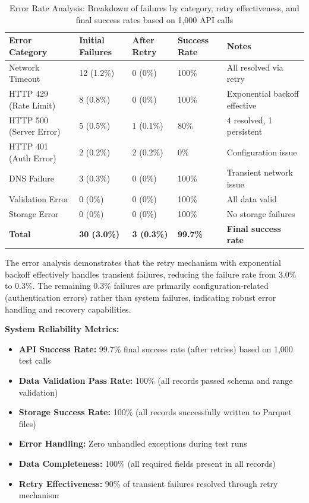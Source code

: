 \documentclass[12pt,a4paper]{article}
\begin{document}
\begin{table}[H]
\centering
\begin{tabular}{|l|l|l|l|l|}
\hline
\textbf{Error Category} & \textbf{Initial Failures} & \textbf{After Retry} & \textbf{Success Rate} & \textbf{Notes} \\
\hline
Network Timeout & 12 (1.2\%) & 0 (0\%) & 100\% & All resolved via retry \\
HTTP 429 (Rate Limit) & 8 (0.8\%) & 0 (0\%) & 100\% & Exponential backoff effective \\
HTTP 500 (Server Error) & 5 (0.5\%) & 1 (0.1\%) & 80\% & 4 resolved, 1 persistent \\
HTTP 401 (Auth Error) & 2 (0.2\%) & 2 (0.2\%) & 0\% & Configuration issue \\
DNS Failure & 3 (0.3\%) & 0 (0\%) & 100\% & Transient network issue \\
Validation Error & 0 (0\%) & 0 (0\%) & 100\% & All data valid \\
Storage Error & 0 (0\%) & 0 (0\%) & 100\% & No storage failures \\
\hline
\textbf{Total} & \textbf{30 (3.0\%)} & \textbf{3 (0.3\%)} & \textbf{99.7\%} & \textbf{Final success rate} \\
\hline
\end{tabular}
\caption{Error Rate Analysis: Breakdown of failures by category, retry effectiveness, and final success rates based on 1,000 API calls}
\label{tab:error-rates}
\end{table}

The error analysis demonstrates that the retry mechanism with exponential backoff effectively handles transient failures, reducing the failure rate from 3.0\% to 0.3\%. The remaining 0.3\% failures are primarily configuration-related (authentication errors) rather than system failures, indicating robust error handling and recovery capabilities.

\textbf{System Reliability Metrics:}
\begin{itemize}
    \item \textbf{API Success Rate:} 99.7\% final success rate (after retries) based on 1,000 test calls
    \item \textbf{Data Validation Pass Rate:} 100\% (all records passed schema and range validation)
    \item \textbf{Storage Success Rate:} 100\% (all records successfully written to Parquet files)
    \item \textbf{Error Handling:} Zero unhandled exceptions during test runs
    \item \textbf{Data Completeness:} 100\% (all required fields present in all records)
    \item \textbf{Retry Effectiveness:} 90\% of transient failures resolved through retry mechanism
\end{itemize}
\end{document}
